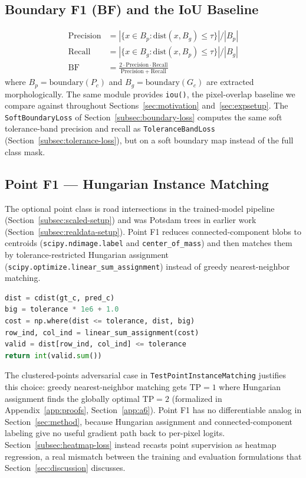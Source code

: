 \subsection{Boundary F1 (BF) and the IoU Baseline}
\label{subsec:bf}

\begin{align}
  \mathrm{Precision} &= |\{x \in B_p : \mathrm{dist}(x, B_g) \le \tau\}| / |B_p| \\
  \mathrm{Recall} &= |\{x \in B_g : \mathrm{dist}(x, B_p) \le \tau\}| / |B_g| \\
  \mathrm{BF} &= \frac{2 \cdot \mathrm{Precision} \cdot \mathrm{Recall}}
                      {\mathrm{Precision} + \mathrm{Recall}}
\end{align}
where $B_p = \mathrm{boundary}(P_c)$ and $B_g = \mathrm{boundary}(G_c)$ are extracted
morphologically. The same module provides \texttt{iou()}, the pixel-overlap baseline we compare
against throughout Sections~\ref{sec:motivation} and~\ref{sec:expsetup}. The
\texttt{SoftBoundaryLoss} of Section~\ref{subsec:boundary-loss} computes the same soft
tolerance-band precision and recall as \texttt{ToleranceBandLoss}
(Section~\ref{subsec:tolerance-loss}), but on a soft boundary map instead of the full class mask.

\subsection{Point F1 --- Hungarian Instance Matching}
\label{subsec:pointf1}

The optional point class is road intersections in the trained-model pipeline
(Section~\ref{subsec:scaled-setup}) and was Potsdam trees in earlier work
(Section~\ref{subsec:realdata-setup}). Point F1 reduces connected-component blobs to centroids
(\texttt{scipy.ndimage.label} and \texttt{center\_of\_mass}) and then matches them by
tolerance-restricted Hungarian assignment (\texttt{scipy.optimize.linear\_sum\_assignment})
instead of greedy nearest-neighbor matching.

\begin{lstlisting}[language=Python, caption={Hungarian assignment core, \texttt{metrics/point\_f1.py:58-65}}]
dist = cdist(gt_c, pred_c)
big = tolerance * 1e6 + 1.0
cost = np.where(dist <= tolerance, dist, big)
row_ind, col_ind = linear_sum_assignment(cost)
valid = dist[row_ind, col_ind] <= tolerance
return int(valid.sum())
\end{lstlisting}

The clustered-points adversarial case in \texttt{TestPointInstanceMatching} justifies this choice:
greedy nearest-neighbor matching gets $\mathrm{TP}=1$ where Hungarian assignment finds the
globally optimal $\mathrm{TP}=2$ (formalized in Appendix~\ref{app:proofs},
Section~\ref{app:a6}). Point F1 has no differentiable analog in Section~\ref{sec:method}, because
Hungarian assignment and connected-component labeling give no useful gradient path back to
per-pixel logits. Section~\ref{subsec:heatmap-loss} instead recasts point supervision as heatmap
regression, a real mismatch between the training and evaluation formulations that
Section~\ref{sec:discussion} discusses.

